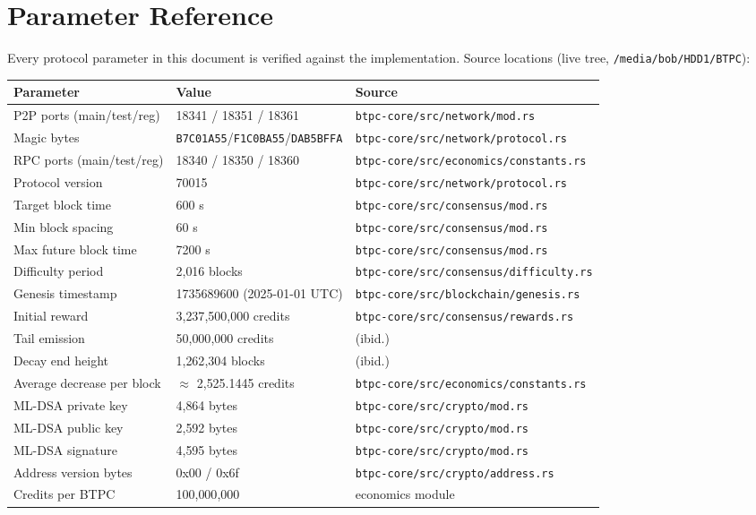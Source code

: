 \documentclass[11pt,a4paper]{article}
\begin{document}
\appendix

\section{Parameter Reference}

Every protocol parameter in this document is verified against the implementation. Source locations (live tree, \texttt{/media/bob/HDD1/BTPC}):

\begin{center}
\begin{tabular}{llp{6.4cm}}
\toprule
\textbf{Parameter} & \textbf{Value} & \textbf{Source} \\
\midrule
P2P ports (main/test/reg) & 18341 / 18351 / 18361 & \texttt{btpc-core/src/network/mod.rs} \\
Magic bytes & \texttt{B7C01A55}/\texttt{F1C0BA55}/\texttt{DAB5BFFA} & \texttt{btpc-core/src/network/protocol.rs} \\
RPC ports (main/test/reg) & 18340 / 18350 / 18360 & \texttt{btpc-core/src/economics/constants.rs} \\
Protocol version & 70015 & \texttt{btpc-core/src/network/protocol.rs} \\
Target block time & 600 s & \texttt{btpc-core/src/consensus/mod.rs} \\
Min block spacing & 60 s & \texttt{btpc-core/src/consensus/mod.rs} \\
Max future block time & 7200 s & \texttt{btpc-core/src/consensus/mod.rs} \\
Difficulty period & 2{,}016 blocks & \texttt{btpc-core/src/consensus/difficulty.rs} \\
Genesis timestamp & 1735689600 (2025-01-01 UTC) & \texttt{btpc-core/src/blockchain/genesis.rs} \\
Initial reward & 3{,}237{,}500{,}000 credits & \texttt{btpc-core/src/consensus/rewards.rs} \\
Tail emission & 50{,}000{,}000 credits & (ibid.) \\
Decay end height & 1{,}262{,}304 blocks & (ibid.) \\
Average decrease per block & $\approx$ 2{,}525.1445 credits & \texttt{btpc-core/src/economics/constants.rs} \\
ML-DSA private key & 4{,}864 bytes & \texttt{btpc-core/src/crypto/mod.rs} \\
ML-DSA public key & 2{,}592 bytes & \texttt{btpc-core/src/crypto/mod.rs} \\
ML-DSA signature & 4{,}595 bytes & \texttt{btpc-core/src/crypto/mod.rs} \\
Address version bytes & 0x00 / 0x6f & \texttt{btpc-core/src/crypto/address.rs} \\
Credits per BTPC & 100{,}000{,}000 & economics module \\
\bottomrule
\end{tabular}
\end{center}
\end{document}
